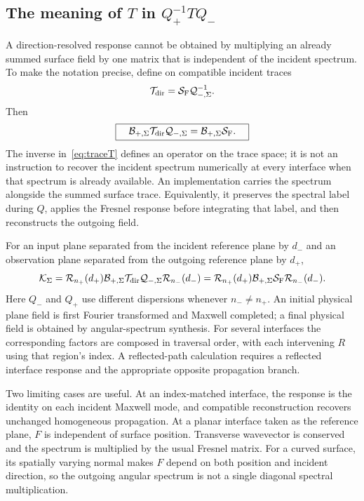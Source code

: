\documentclass[11pt,a4paper]{article}
\newcommand{\Q}{\mathcal Q}
\newcommand{\R}{\mathcal R}
\newcommand{\B}{\mathcal B}
\newcommand{\T}{\mathcal T}
\newcommand{\SF}{\mathcal S_{\mathrm F}}
\numberwithin{equation}{section}
\begin{document}
\subsection{The meaning of \texorpdfstring{$T$ in $Q_+^{-1}TQ_-$}{T in Q inverse T Q}}

A direction-resolved response cannot be obtained by multiplying an already
summed surface field by one matrix that is independent of the incident
spectrum. To make the notation precise, define on compatible incident traces
\begin{equation}
 \T_{\rm dir}=\SF\Q_{-,\Sigma}^{-1}.
 \label{eq:traceT}
\end{equation}
Then
\begin{equation}
 \boxed{\quad
 \B_{+,\Sigma}\T_{\rm dir}\Q_{-,\Sigma}
 =\B_{+,\Sigma}\SF .\quad}
 \label{eq:QTQ}
\end{equation}
The inverse in~\eqref{eq:traceT} defines an operator on the trace space; it is
not an instruction to recover the incident spectrum numerically at every
interface when that spectrum is already available. An implementation carries
the spectrum alongside the summed surface trace. Equivalently, it preserves
the spectral label during $Q$, applies the Fresnel response before integrating
that label, and then reconstructs the outgoing field.

For an input plane separated from the incident reference plane by $d_-$ and
an observation plane separated from the outgoing reference plane by $d_+$,
\begin{equation}
 \mathcal K_\Sigma=
 \R_{n_+}(d_+)\B_{+,\Sigma}\T_{\rm dir}\Q_{-,\Sigma}\R_{n_-}(d_-)
 =\R_{n_+}(d_+)\B_{+,\Sigma}\SF\R_{n_-}(d_-).
 \label{eq:fullpipeline}
\end{equation}
Here $Q_-$ and $Q_+$ use different dispersions whenever $n_-\ne n_+$.
An initial physical plane field is first Fourier transformed and Maxwell
completed; a final physical field is obtained by angular-spectrum synthesis.
For several interfaces the corresponding factors are composed in traversal
order, with each intervening $R$ using that region's index. A reflected-path
calculation requires a reflected interface response and the appropriate
opposite propagation branch.

Two limiting cases are useful. At an index-matched interface, the response is
the identity on each incident Maxwell mode, and compatible reconstruction
recovers unchanged homogeneous propagation. At a planar interface taken as the
reference plane, $F$ is independent of surface position. Transverse wavevector
is conserved and the spectrum is multiplied by the usual Fresnel matrix.
For a curved surface, its spatially varying normal makes $F$ depend on both
position and incident direction, so the outgoing angular spectrum is not a
single diagonal spectral multiplication.
\end{document}
